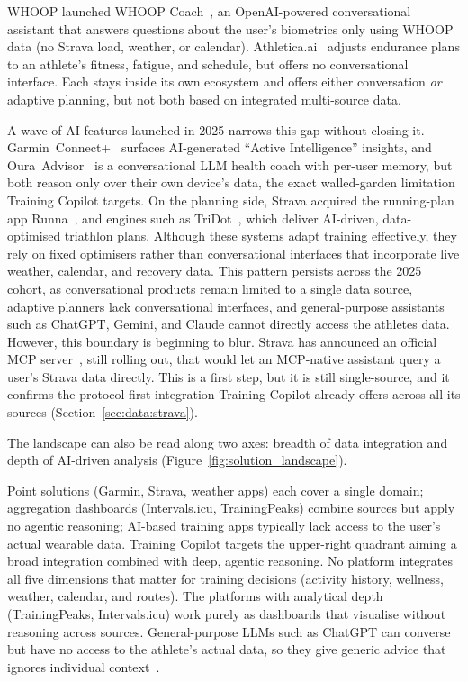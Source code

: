 WHOOP launched WHOOP Coach~\citep{whoop_coach_2024}, an OpenAI-powered conversational assistant that answers questions about the user's biometrics only using WHOOP data (no Strava load, weather, or calendar). Athletica.ai~\citep{athletica_ai_2024} adjusts endurance plans to an athlete's fitness, fatigue, and schedule, but offers no conversational interface. Each stays inside its own ecosystem and offers either conversation \textit{or} adaptive planning, but not both based on integrated multi-source data.

A wave of AI features launched in 2025 narrows this gap without closing it. Garmin~Connect+~\citep{garmin_connectplus_2025} surfaces AI-generated ``Active Intelligence'' insights, and Oura~Advisor~\citep{oura_advisor_2025} is a conversational LLM health coach with per-user memory, but both reason only over their own device's data, the exact walled-garden limitation Training Copilot targets. On the planning side, Strava acquired the running-plan app Runna~\citep{runna_2025}, and engines such as TriDot~\citep{tridot_2025}, which deliver AI-driven, data-optimised triathlon plans. Although these systems adapt training effectively, they rely on fixed optimisers rather than conversational interfaces that incorporate live weather, calendar, and recovery data. This pattern persists across the 2025 cohort, as conversational products remain limited to a single data source, adaptive planners lack conversational interfaces, and general-purpose assistants such as ChatGPT, Gemini, and Claude cannot directly access the athletes data. However, this boundary is beginning to blur. Strava has announced an official MCP server~\citep{strava_api_update_2026}, still rolling out, that would let an MCP-native assistant query a user's Strava data directly. This is a first step, but it is still single-source, and it confirms the protocol-first integration Training Copilot already offers across all its sources (Section~\ref{sec:data:strava}).

The landscape can also be read along two axes: breadth of data integration and depth of AI-driven analysis (Figure~\ref{fig:solution_landscape}).



Point solutions (Garmin, Strava, weather apps) each cover a single domain; aggregation dashboards (Intervals.icu, TrainingPeaks) combine sources but apply no agentic reasoning; AI-based training apps typically lack access to the user's actual wearable data. Training Copilot targets the upper-right quadrant aiming a broad integration combined with deep, agentic reasoning. No platform integrates all five dimensions that matter for training decisions (activity history, wellness, weather, calendar, and routes). The platforms with analytical depth (TrainingPeaks, Intervals.icu) work purely as dashboards that visualise without reasoning across sources. General-purpose LLMs such as ChatGPT can converse but have no access to the athlete's actual data, so they give generic advice that ignores individual context~\citep{puce_harnessing_2025}.

